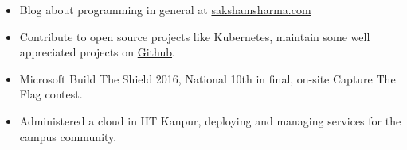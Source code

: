 \vspace{-0.2cm}


{\fontsize{11pt}{1em}\bodyfontlight\upshape\color{text}
\begin{itemize}
  \itemsep-0.3em
  \item Blog about programming in general at \href{https://sakshamsharma.com}{sakshamsharma.com}
  \item Contribute to open source projects like Kubernetes, maintain some well appreciated
    projects on \href{https://github.com/sakshamsharma}{Github}.
  \item Microsoft Build The Shield 2016, National 10th in final,
    on-site Capture The Flag contest.
  \item Administered a cloud in IIT Kanpur, deploying and managing services for the campus community.
\end{itemize}
}

